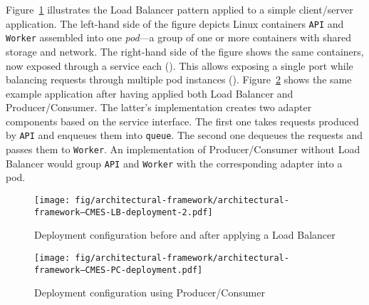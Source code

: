 Figure~\ref{fig:architectural-framework--CMES-LB-deployment} illustrates the Load Balancer pattern applied to a simple client/server application. The left-hand side of the figure depicts Linux containers \texttt{API} and \texttt{Worker} assembled into one \emph{pod}---a group of one or more containers with shared storage and network. The right-hand side of the figure shows the same containers, now exposed through a service each (). This allows exposing a single port while balancing requests through multiple pod instances (). Figure~\ref{fig:architectural-framework--CMES-PC-deployment} shows the same example application after having applied both Load Balancer and Producer/Consumer. The latter's implementation creates two adapter components based on the service interface. The first one takes requests produced by \texttt{API} and enqueues them into \texttt{queue}. The second one dequeues the requests and passes them to \texttt{Worker}. An implementation of Producer/Consumer without Load Balancer would group \texttt{API} and \texttt{Worker} with the corresponding adapter into a pod.

\begin{figure}[h]
	\centering
	\texttt{[image: fig/architectural-framework/architectural-framework--CMES-LB-deployment-2.pdf]}
	\caption{Deployment configuration before and after applying a Load Balancer}
	\label{fig:architectural-framework--CMES-LB-deployment}
\end{figure}

\begin{figure}[h]
	\centering
	\texttt{[image: fig/architectural-framework/architectural-framework--CMES-PC-deployment.pdf]}
	\caption{Deployment configuration using Producer/Consumer}
	\label{fig:architectural-framework--CMES-PC-deployment}
\end{figure}



